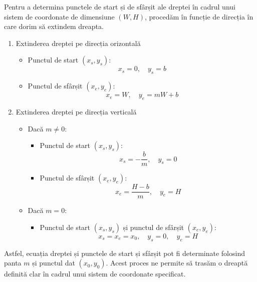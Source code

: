 Pentru a determina punctele de start și de sfârșit ale dreptei în cadrul unui sistem de coordonate de dimensiune $(W, H)$, procedăm în funcție de direcția în care dorim să extindem dreapta.
\begin{enumerate}
    \item Extinderea dreptei pe direcția orizontală
          \begin{itemize}
              \item Punctul de start $(x_s, y_s)$:
                    \[
                        x_s = 0, \quad y_s = b
                    \]
              \item Punctul de sfârșit $(x_e, y_e)$:
                    \[
                        x_e = W, \quad y_e = mW + b
                    \]
          \end{itemize}
    \item Extinderea dreptei pe direcția verticală
          \begin{itemize}
              \item  Dacă $m \neq 0$:
                    \begin{itemize}

                        \item Punctul de start $(x_s, y_s)$:
                              \[
                                  x_s = -\frac{b}{m}, \quad y_s = 0
                              \]
                        \item Punctul de sfârșit $(x_e, y_e)$:
                              \[
                                  x_e = \frac{H - b}{m}, \quad y_e = H
                              \]
                    \end{itemize}
              \item Dacă $m = 0$:
                    \begin{itemize}
                        \item Punctul de start $(x_s, y_s)$ și punctul de sfârșit $(x_e, y_e)$:
                              \[
                                  x_s = x_e = x_0, \quad y_s = 0, \quad y_e = H
                              \]
                    \end{itemize}

          \end{itemize}
\end{enumerate}

Astfel, ecuația dreptei și punctele de start și sfârșit pot fi determinate folosind panta $m$ și punctul dat $(x_0, y_0)$. Acest proces ne permite să trasăm o dreaptă definită clar în cadrul unui sistem de coordonate specificat.

